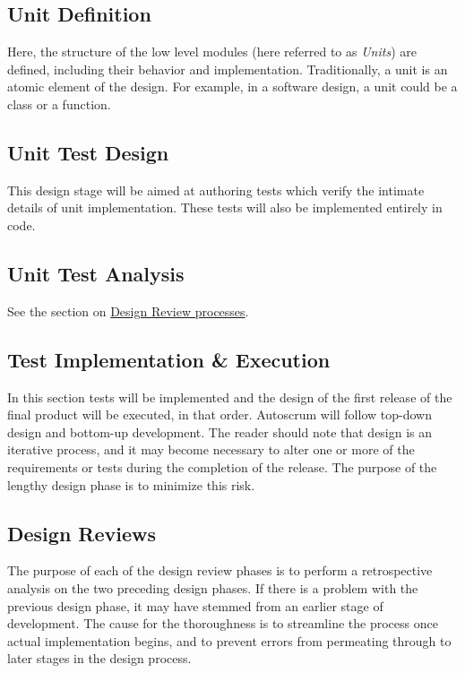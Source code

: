 \documentclass[12pt]{article}
\begin{document}
\subsection{Unit Definition}
Here, the structure of the low level modules (here referred to as {\it Units})
are defined, including their behavior and implementation. Traditionally, a
unit is an atomic element of the design. For example, in a software design,
a unit could be a class or a function.

\subsection{Unit Test Design}
This design stage will be aimed at authoring tests which verify the intimate
details of unit implementation. These tests will also be implemented entirely
in code.

\subsection{Unit Test Analysis}
See the section on \hyperref[sec:review]{Design Review processes}.
\pagebreak

\subsection{Test Implementation \& Execution}
In this section tests will be implemented and the design of the first release
of the final product will be executed, in that order. Autoscrum will follow
top-down design and bottom-up development. The reader should note that design
is an iterative process, and it may become necessary to alter one or more of
the requirements or tests during the completion of the release. The purpose of
the lengthy design phase is to minimize this risk.

\subsection{Design Reviews}
\label{sec:review}
The purpose of each of the design review phases is to perform a retrospective
analysis on the two preceding design phases. If there is a problem with the
previous design phase, it may have stemmed from an earlier stage of
development. The cause for the thoroughness is to streamline the process once
actual implementation begins, and to prevent errors from permeating through to
later stages in the design process.
\end{document}
